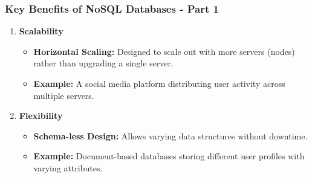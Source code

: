 \documentclass[aspectratio=169]{beamer}
\begin{document}
\begin{frame}[fragile]
    \frametitle{Key Benefits of NoSQL Databases - Part 1}
    \begin{enumerate}
        \item \textbf{Scalability}
            \begin{itemize}
                \item \textbf{Horizontal Scaling:} Designed to scale out with more servers (nodes) rather than upgrading a single server.
                \item \textbf{Example:} A social media platform distributing user activity across multiple servers.
            \end{itemize}
            
        \item \textbf{Flexibility}
            \begin{itemize}
                \item \textbf{Schema-less Design:} Allows varying data structures without downtime.
                \item \textbf{Example:} Document-based databases storing different user profiles with varying attributes.
            \end{itemize}
    \end{enumerate}
\end{frame}
\end{document}
